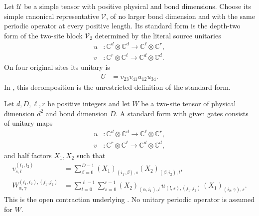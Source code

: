 \begin{definition}
    \label{SF}
    \leanok
    Let $\mathcal U$ be a simple tensor with positive physical and bond
    dimensions. Choose its simple canonical representative $\mathcal V$,
    of no larger bond dimension and with the same periodic operator at every
    positive length. Its standard form is the depth-two form of the two-site
    block $\mathcal V_2$ determined by the literal source unitaries
    \begin{align}
        u & \colon\mathbb C^d\otimes\mathbb C^d
        \longrightarrow\mathbb C^\ell\otimes\mathbb C^r, \\
        v & \colon\mathbb C^r\otimes\mathbb C^\ell
        \longrightarrow\mathbb C^d\otimes\mathbb C^d.
    \end{align}
    On four original sites its unitary is
    \begin{align}
        U & =v_{23}v_{41}u_{12}u_{34}.
    \end{align}
    In \cite[Definition~III.9]{Cirac2017MPU}, this decomposition is the unrestricted definition of the
    standard form.
\end{definition}

\begin{definition}
    \label{def:mpu_supplied_two_site_standard_form}
    \leanok
    Let $d,D,\ell,r$ be positive integers and let
    $W$ be a two-site tensor of physical dimension $d^2$ and bond dimension
    $D$. A standard form with given gates consists of unitary maps
    \begin{align}
        u & \colon \mathbb C^d\otimes\mathbb C^d
        \longrightarrow \mathbb C^\ell\otimes\mathbb C^r, \\
        v & \colon \mathbb C^r\otimes\mathbb C^\ell
        \longrightarrow \mathbb C^d\otimes\mathbb C^d,
    \end{align}
    and half factors $X_1,X_2$ such that
    \begin{align}
        v^{(i_1,i_2)}_{s,l}
         & =\sum_{\beta=0}^{D-1}
        (X_1)_{(i_1,\beta),s}(X_2)_{(\beta,i_2),l}, \\
        W^{(i_1,i_2),(j_1,j_2)}_{\alpha,\gamma}
         & =\sum_{l=0}^{\ell-1}\sum_{s=0}^{r-1}
        (X_2)_{(\alpha,i_1),l}\,
        u_{(l,s),(j_1,j_2)}\,
        (X_1)_{(i_2,\gamma),s}.
    \end{align}
    This is the open contraction underlying
    \cite[Definition~III.9]{Cirac2017MPU}. No unitary periodic operator is
    assumed for $W$.
\end{definition}

